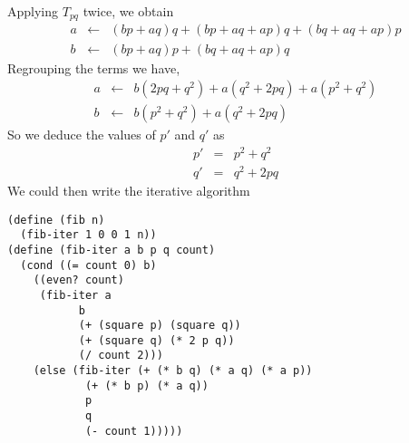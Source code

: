 \documentclass[a4paper,12pt]{article}
\begin{document}
\noindent
Applying $T_{pq}$ twice, we obtain
\begin{eqnarray*}
a &\leftarrow& (bp+aq)q + (bp+aq+ap)q + (bq+aq+ap)p \\
b &\leftarrow& (bp+aq)p + (bq+aq+ap)q
\end{eqnarray*}
Regrouping the terms we have,
\begin{eqnarray*}
a &\leftarrow& b(2pq+ q^2) + a(q^2 + 2pq) + a(p^2 + q^2) \\
b &\leftarrow& b(p^2+q^2) + a(q^2+2pq)
\end{eqnarray*}
So we deduce the values of $p'$ and $q'$ as
\begin{eqnarray*}
p' &=& p^2 + q^2 \\
q' &=& q^2 + 2pq
\end{eqnarray*}
We could then write the iterative algorithm
\begin{lstlisting}
(define (fib n)
  (fib-iter 1 0 0 1 n))
(define (fib-iter a b p q count)
  (cond ((= count 0) b)
	((even? count)
	 (fib-iter a
		   b
		   (+ (square p) (square q))
		   (+ (square q) (* 2 p q))
		   (/ count 2)))
	(else (fib-iter (+ (* b q) (* a q) (* a p))
			(+ (* b p) (* a q))
			p
			q
			(- count 1)))))
\end{lstlisting}
\end{document}
